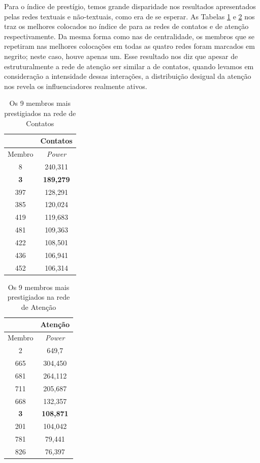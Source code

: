 Para o índice de prestígio, temos grande disparidade nos resultados apresentados
pelas redes textuais e não-textuais, como era de se esperar. As Tabelas
\ref{ap:tab:prest-contato} e \ref{ap:tab:prest-completa} nos traz os melhores
colocados no índice de \citeauthor{Bonacich1987} para as redes de contatos e de
atenção respectivamente. Da mesma forma como nas de centralidade, os membros que
se repetiram nas melhores colocações em todas as quatro redes foram marcados em
negrito; neste caso, houve apenas um. Esse resultado nos diz que apesar de
estruturalmente a rede de atenção ser similar a de contatos, quando levamos em
consideração a intensidade dessas interações, a distribuição desigual da atenção
nos revela os influenciadores realmente ativos.

\begin{table}[htbp]
	\setlength{\arrayrulewidth}{2\arrayrulewidth}  %
	\setlength{\belowcaptionskip}{10pt}  %
	\caption{Os 9 membros mais prestigiados na rede de Contatos} \centering   
	\begin{tabular}{| c | c |}
	\hline
	\citeauthor{Bonacich1987} & Contatos\\ \hline\hline
	Membro & \emph{Power} \\ \hline
	8 & 240,311 \\
	\textbf{3} & \textbf{189,279} \\
	397 & 128,291 \\
	385 & 120,024 \\
	419 & 119,683 \\
 	481 & 109,363 \\
 	422 & 108,501 \\
 	436 & 106,941 \\ 
 	452 & 106,314 \\\hline
	\end{tabular}
	\label{ap:tab:prest-contato}
\end{table}

\begin{table}[htbp]
	\setlength{\arrayrulewidth}{2\arrayrulewidth}  %
	\setlength{\belowcaptionskip}{10pt}  %
	\caption{Os 9 membros mais prestigiados na rede de Atenção} \centering   
	\begin{tabular}{| c | c |}
	\hline
	\citeauthor{Bonacich1987} & Atenção\\ \hline\hline
	Membro & \emph{Power} \\ \hline
	2 & 649,7 \\
	665 & 304,450 \\
	681 & 264,112 \\
	711 & 205,687 \\
	668 & 132,357 \\
	\textbf{3} & \textbf{108,871} \\
	201 & 104,042 \\
	781 & 79,441 \\
	826 & 76,397 \\\hline
	\end{tabular}
	\label{ap:tab:prest-completa}
\end{table}

